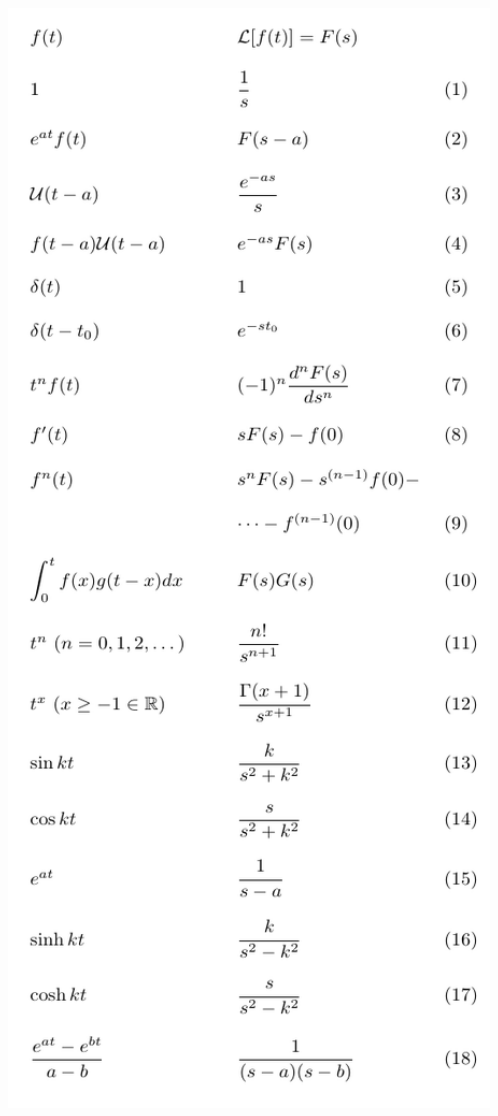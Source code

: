 \documentclass[11pt]{article}
\begin{document}
\includegraphics[width=0.98\textwidth]{images/img_koma/laplace_table1.png}\newline
\end{document}
